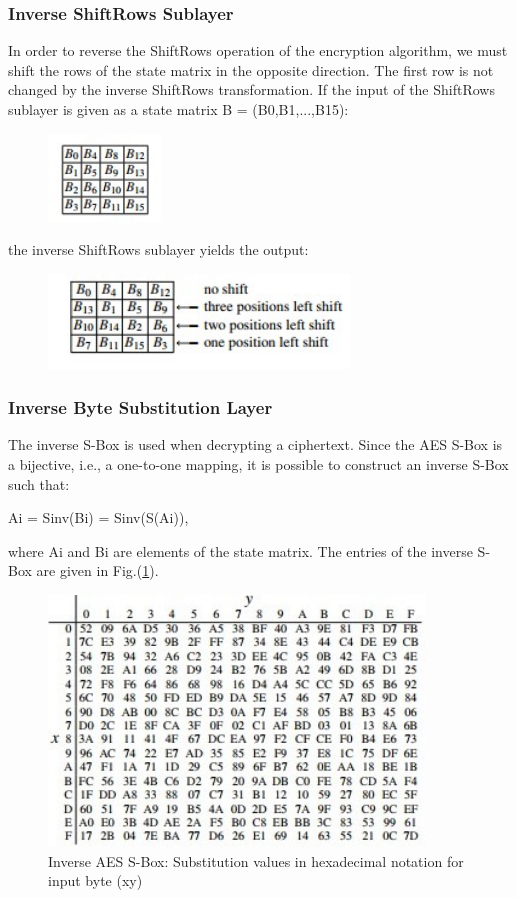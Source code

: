 \documentclass[../main.tex]{subfiles}
\begin{document}
\subsubsection{Inverse ShiftRows Sublayer}
In order to reverse the ShiftRows operation of the encryption algorithm, we must
shift the rows of the state matrix in the opposite direction. The first row is not
changed by the inverse ShiftRows transformation. If the input of the ShiftRows
sublayer is given as a state matrix B = (B0,B1,...,B15):
\begin{figure}[h]
\centering
\includegraphics[width=3cm]{diagrams/cryp18.jpg}
\end{figure}
the inverse ShiftRows sublayer yields the output:
\begin{figure}[h]
\centering
\includegraphics[width=8cm]{diagrams/cryp19.jpg}
\end{figure}
\subsubsection{Inverse Byte Substitution Layer}
The inverse S-Box is used when decrypting a ciphertext. Since the AES S-Box is
a bijective, i.e., a one-to-one mapping, it is possible to construct an inverse S-Box
such that:
\begin{center} 
Ai = Sinv(Bi) = Sinv(S(Ai)),
\end{center}
where Ai and Bi are elements of the state matrix. The entries of the inverse S-Box
are given in Fig.(\ref{fig:cryp20}).
\begin{figure}[h]
\centering
\includegraphics[width=10cm]{diagrams/cryp20.jpg}

\caption{Inverse AES S-Box: Substitution values in hexadecimal notation for input byte (xy)}
\label{fig:cryp20}
\end{figure}
\end{document}
